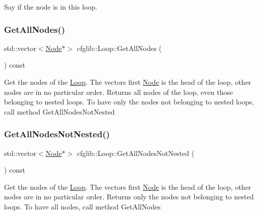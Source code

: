 Say if the node is in this loop. \mbox{\label{classcfglib_1_1Loop_a20282571d9b3cef7723049480d3898fb}} 
\subsubsection{\texorpdfstring{Get\+All\+Nodes()}{GetAllNodes()}}
{\footnotesize\ttfamily std\+::vector$<$\hyperlink{classcfglib_1_1Node}{Node}$\ast$$>$ cfglib\+::\+Loop\+::\+Get\+All\+Nodes (\begin{DoxyParamCaption}{ }\end{DoxyParamCaption}) const}

Get the nodes of the \hyperlink{classcfglib_1_1Loop}{Loop}. The vector\textquotesingle{}s first \hyperlink{classcfglib_1_1Node}{Node} is the head of the loop, other nodes are in no particular order. Returns all nodes of the loop, even those belonging to nested loops. To have only the nodes not belonging to nested loops, call method Get\+All\+Nodes\+Not\+Nested \mbox{\label{classcfglib_1_1Loop_a9dbb2c3b99d8a5cb6a89f725ac5e46b3}} 
\subsubsection{\texorpdfstring{Get\+All\+Nodes\+Not\+Nested()}{GetAllNodesNotNested()}}
{\footnotesize\ttfamily std\+::vector$<$\hyperlink{classcfglib_1_1Node}{Node}$\ast$$>$ cfglib\+::\+Loop\+::\+Get\+All\+Nodes\+Not\+Nested (\begin{DoxyParamCaption}{ }\end{DoxyParamCaption}) const}

Get the nodes of the \hyperlink{classcfglib_1_1Loop}{Loop}. The vector\textquotesingle{}s first \hyperlink{classcfglib_1_1Node}{Node} is the head of the loop, other nodes are in no particular order. Returns only the nodes not belonging to nested loops. To have all nodes, call method Get\+All\+Nodes \mbox{\label{classcfglib_1_1Loop_ae7a81ef3af9e19ef9cf86e4d807e76eb}} 
